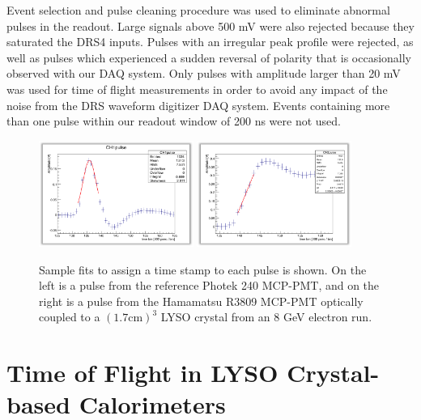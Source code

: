 \documentclass[12pt]{article}
\begin{document}
Event selection and pulse cleaning procedure was used to eliminate abnormal
pulses in the readout. Large signals above 500 mV were also rejected because
they saturated the DRS4 inputs. Pulses with an irregular peak profile were
rejected, as well as pulses which experienced a sudden reversal of polarity that
is occasionally observed with our DAQ system. Only pulses with amplitude 
larger than 20 mV was used for time of flight measurements in order to 
avoid any impact of the noise from the DRS waveform digitizer DAQ system. 
Events containing more than one pulse within our readout window of 200 ns 
were not used. 

\begin{figure}[h] \centering
\includegraphics[width=0.45\textwidth]{figs/RefPulseFit} 
\includegraphics[width=0.45\textwidth]{figs/ScintPulseFit} 
\caption{Sample fits to assign a time stamp to each pulse is shown. 
On the left is a pulse from the reference Photek 240 MCP-PMT, and
on the right is a pulse from the Hamamatsu R3809 MCP-PMT
optically coupled to a $(1.7\mathrm{ cm})^3$  LYSO crystal
from an 8 GeV electron run.}
\label{fig:PulseFits}
\end{figure}


\section{Time of Flight in LYSO Crystal-based Calorimeters}
\end{document}
